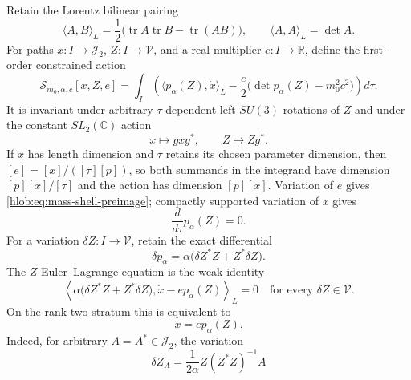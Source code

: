 Retain the Lorentz bilinear pairing
\begin{equation}
 \langle A,B\rangle_L
 =\frac12\bigl(\operatorname{tr}A\operatorname{tr}B
                    -\operatorname{tr}(AB)\bigr),
 \qquad
 \langle A,A\rangle_L=\det A.
 \label{hlob:eq:lorentz-pairing}
\end{equation}
For paths \(x:I\to\mathcal J_2\), \(Z:I\to\mathscr V\), and a real
multiplier \(e:I\to\mathbb R\), define the first-order constrained action
\begin{equation}
 \mathcal S_{m_0,\alpha,c}[x,Z,e]
 =\int_I
 \left(
  \langle p_\alpha(Z),\dot x\rangle_L
  -\frac{e}{2}\bigl(\det p_\alpha(Z)-m_0^2c^2\bigr)
 \right)d\tau.
 \label{hlob:eq:worldline-action}
\end{equation}
It is invariant under arbitrary \(\tau\)-dependent left \(SU(3)\) rotations
of \(Z\) and under the constant \(SL_2(\mathbb C)\) action
\begin{equation}
 x\longmapsto gxg^*,\qquad Z\longmapsto Zg^*.
 \label{hlob:eq:worldline-Lorentz-action}
\end{equation}
If \(x\) has length dimension and \(\tau\) retains its
chosen parameter dimension, then
\([e]=[x]/([\tau][p])\), so both summands in the integrand have dimension
\([p][x]/[\tau]\) and the action has dimension \([p][x]\).
Variation of \(e\) gives
\eqref{hlob:eq:mass-shell-preimage}; compactly supported variation of \(x\)
gives
\begin{equation}
 \frac{d}{d\tau}p_\alpha(Z)=0.
 \label{hlob:eq:momentum-conservation}
\end{equation}
For a variation \(\delta Z:I\to\mathscr V\), retain the exact differential
\begin{equation}
 \delta p_\alpha
 =\alpha\bigl(\delta Z^*Z+Z^*\delta Z\bigr).
 \label{hlob:eq:momentum-differential}
\end{equation}
The \(Z\)-Euler--Lagrange equation is the weak identity
\begin{equation}
 \left\langle
 \alpha\bigl(\delta Z^*Z+Z^*\delta Z\bigr),
 \dot x-e p_\alpha(Z)
 \right\rangle_L=0
 \quad\text{for every }\delta Z\in\mathscr V.
 \label{hlob:eq:Z-weak-equation}
\end{equation}
On the rank-two stratum this is equivalent to
\begin{equation}
 \dot x=e p_\alpha(Z).
 \label{hlob:eq:worldline-velocity}
\end{equation}
Indeed, for arbitrary \(A=A^*\in\mathcal J_2\), the variation
\begin{equation}
 \delta Z_A
 =\frac{1}{2\alpha}Z(Z^*Z)^{-1}A
 \label{hlob:eq:surjective-gram-variation}
\end{equation}

